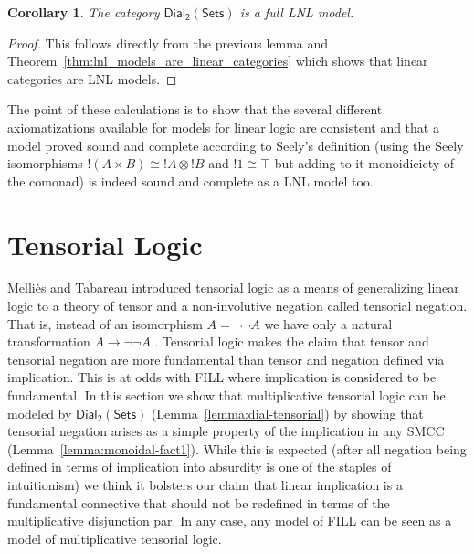 \documentclass{elsarticle}
\newcommand{\dial}[0]{\mathsf{Dial_2}(\mathsf{Sets})}
\newtheorem{corollary}[theorem]{Corollary}
\begin{document}
\begin{corollary}
  \label{corollary:dial-FLNL}
  The category $\dial$ is a full LNL model.
\end{corollary}
\begin{proof}
  This follows directly from the previous lemma and
  Theorem~\ref{thm:lnl_models_are_linear_categories} which shows that
  linear categories are LNL models.
\end{proof}


The point of these calculations is to show that the several different
axiomatizations available for models for linear logic are consistent
and that a model proved sound and complete according to Seely's
definition (using the Seely isomorphisms $!(A \times B)\cong !A\otimes
!B$ and $!1\cong \top$ but adding to it monoidicicty of the comonad)
is indeed sound and complete as a LNL model too.

\section{Tensorial Logic}
\label{sec:tensor_logic}

Melli\`es and Tabareau introduced tensorial logic as a means of
generalizing linear logic to a theory of tensor and a non-involutive
negation called tensorial negation.  That is, instead of an
isomorphism $A = \lnot\lnot A$ we have only a natural transformation
$A \to \lnot\lnot A$ \cite{Mellies:2008}.  Tensorial logic makes the
claim that tensor and tensorial negation are more fundamental than
tensor and negation defined via implication.  This is at odds with
FILL where implication is considered to be fundamental.  In this
section we show that multiplicative tensorial logic can be modeled by
$\dial$ (Lemma~\ref{lemma:dial-tensorial}) by showing that tensorial
negation arises as a simple property of the implication in any SMCC
(Lemma~\ref{lemma:monoidal-fact1}).  While this is expected (after all
negation being defined in terms of implication into absurdity is one
of the staples of intuitionism) we think it bolsters our claim that
linear implication is a fundamental connective that should not be
redefined in terms of the multiplicative disjunction par.  In any
case, any model of FILL can be seen as a model of multiplicative
tensorial logic.  
\end{document}
